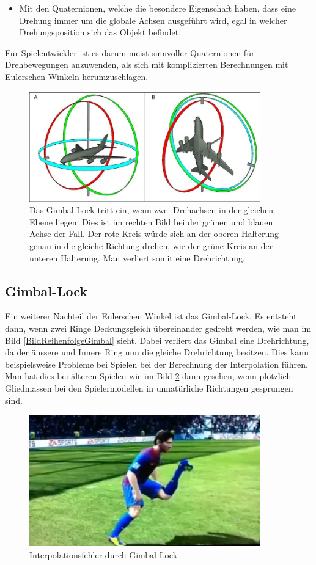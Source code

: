 \begin{itemize}
	\item Mit den Quaternionen, welche die besondere Eigenschaft haben, dass eine Drehung immer um die globale Achsen ausgeführt wird, egal in welcher Drehungsposition sich das Objekt befindet.
\end{itemize}
Für Spielentwickler ist es darum meist sinnvoller Quaternionen für Drehbewegungen anzuwenden, als sich mit komplizierten Berechnungen mit Eulerschen Winkeln herumzuschlagen.

\begin{figure}
	\centering
	\includegraphics[width=10cm]{papers/clifford/Bilder/ReihenfolgeGimbal.png}
	\caption{Das Gimbal Lock tritt ein, wenn zwei Drehachsen in der gleichen Ebene liegen. Dies ist im rechten Bild bei der grünen und blauen Achse der Fall. Der rote Kreis würde sich an der oberen Halterung genau in die gleiche Richtung drehen, wie der grüne Kreis an der unteren Halterung. Man verliert somit eine Drehrichtung.}
	\label{BildReihenfolgeGimbal}
\end{figure}

\subsection{Gimbal-Lock}
Ein weiterer Nachteil der Eulerschen Winkel ist das Gimbal-Lock. Es entsteht dann, wenn zwei Ringe Deckungsgleich übereinander gedreht werden, wie man im Bild \eqref{BildReihenfolgeGimbal} sieht. Dabei verliert das Gimbal eine Drehrichtung, da der äussere und Innere Ring nun die gleiche Drehrichtung besitzen. Dies kann beispielsweise Probleme bei Spielen bei der Berechnung der Interpolation führen. Man hat dies bei älteren Spielen wie im Bild \ref{BildGimbalLock} dann gesehen, wenn plötzlich Gliedmassen bei den Spielermodellen in unnatürliche Richtungen gesprungen sind.

\begin{figure}
	\centering
	\includegraphics[width=10cm]{papers/clifford/Bilder/GimbalLock.png}
	\caption{Interpolationsfehler durch Gimbal-Lock}
	\label{BildGimbalLock}
\end{figure}